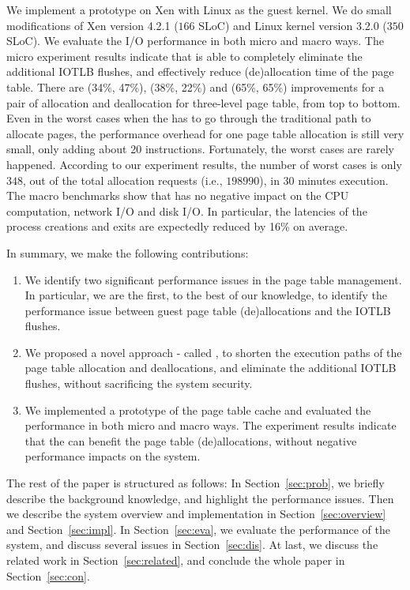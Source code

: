 We implement a prototype on Xen with Linux as the guest kernel. We do small modifications of Xen version 4.2.1 ($166$ SLoC) and Linux kernel version 3.2.0 ($350$ SLoC).
We evaluate the I/O performance in both micro and macro ways.
The micro experiment results indicate that \name is able to completely eliminate the additional IOTLB flushes, and effectively reduce (de)allocation time of the page table.
There are (34\%, 47\%), (38\%, 22\%) and (65\%, 65\%) improvements for a pair of allocation and deallocation for three-level page table, from top to bottom.
Even in the worst cases when the \name has to go through the traditional path to allocate pages, the performance overhead for one page table allocation is still very small, only adding about 20 instructions. Fortunately, the worst cases are rarely happened. According to our experiment results, the number of worst cases is only $348$, out of the total allocation requests (i.e., $198990$), in 30 minutes execution.
The macro benchmarks show that \name has no negative impact on the CPU computation, network I/O and disk I/O.
In particular, the latencies of the process creations and exits are expectedly reduced by 16\% on average.

In summary, we make the following contributions:
\begin{enumerate}
\item We identify two significant performance issues in the page table management. In particular, we are the first, to the best of our knowledge, to identify the performance issue between guest page table (de)allocations and the IOTLB flushes.
\item We proposed a novel approach - called \name, to shorten the execution paths of the page table allocation and deallocations, and eliminate the additional IOTLB flushes, without sacrificing the system security.
\item We implemented a prototype of the page table cache and evaluated the performance in both micro and macro ways. The experiment results indicate that the \name can benefit the page table (de)allocations, without negative performance impacts on the system.
\end{enumerate}

The rest of the paper is structured as follows: In Section~\ref{sec:prob}, we briefly describe the background knowledge, and highlight the performance issues. Then we describe the system overview and implementation in Section~\ref{sec:overview} and Section~\ref{sec:impl}. In Section~\ref{sec:eva}, we evaluate the performance of the \name system, and discuss several issues in Section~\ref{sec:dis}. At last, we discuss the related work in Section~\ref{sec:related}, and conclude the whole paper in Section~\ref{sec:con}.

